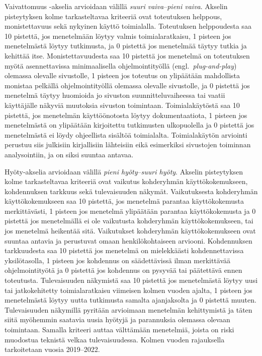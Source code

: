 \documentclass[finnish, 12pt, a4paper, elec, utf8, a-1b, online]{aaltothesis}
\begin{document}
Vaivattomuus -akselia arvioidaan välillä \textit{suuri vaiva}--\textit{pieni
vaiva}. Akselin pisteytyksen kolme tarkasteltavaa kriteeriä ovat toteutuksen
helppous, monistettavuus sekä nykyinen käyttö toimialalla. Toteutuksen
helppoudesta saa 10 pistettä, jos menetelmään löytyy valmis toimialaratkaisu, 1
pisteen jos menetelmästä löytyy tutkimusta, ja 0 pistettä jos menetelmää täytyy
tutkia ja kehittää itse. Monistettavuudesta saa 10 pistettä jos menetelmä on
toteutuksen myötä asennettavissa minimaalisella ohjelmointityöllä
(engl.~\textit{plug-and-play}) olemassa olevalle sivustolle, 1 pisteen jos
toteutus on ylipäätään mahdollista monistaa pelkällä ohjelmointityöllä
olemassa olevalle sivustolle, ja 0 pistettä jos menetelmä täytyy huomioida jo
sivuston suunnitteluvaiheessa tai vaatii käyttäjälle näkyviä muutoksia sivuston
toimintaan. Toimialakäytöstä saa 10 pistettä, jos menetelmän käyttöönotosta
löytyy dokumentaatiota, 1 pisteen jos menetelmästä on ylipäätään kirjoitettu
tutkimusten ulkopuolella ja 0 pistettä jos menetelmästä ei löydy ohjeellista
sisältöä toimialalta. Toimialakäytön arviointi perustuu siis julkisiin
kirjallisiin lähteisiin eikä esimerkiksi sivustojen toiminnan analysointiin, ja
on siksi suuntaa antavaa.

Hyöty-akselia arvioidaan välillä \textit{pieni hyöty}--\textit{suuri hyöty}.
Akselin pisteytyksen kolme tarkasteltavaa kriteeriä ovat vaikutus kohderyhmän
käyttökokemukseen, kohdennuksen tarkkuus sekä tulevaisuuden näkymät.
Vaikutuksesta kohderyhmän käyttökokemukseen saa 10 pistettä, jos menetelmä
parantaa käyttökokemusta merkittävästi, 1 pisteen jos menetelmä ylipäätään
parantaa käyttökokemusta ja 0 pistettä jos menetelmällä ei ole vaikutusta
kohderyhmän käyttökokemukseen, tai jos menetelmä heikentää sitä. Vaikutukset
kohderyhmän käyttökokemukseen ovat suuntaa antavia ja perustuvat omaan
henkilökohtaiseen arviooni. Kohdennuksen tarkkuudesta saa 10 pistettä jos
menetelmä on mielekkäästi kohdennettavissa yksilötasolla, 1 pisteen jos
kohdennus on säädettävissä ilman merkittävää ohjelmointityötä ja 0 pistettä jos
kohdennus on pysyvää tai päätettävä ennen toteutusta. Tulevaisuuden näkymistä
saa 10 pistettä jos menetelmästä löytyy uusi tai jatkokehitetty toimialaratkaisu
viimeisen kolmen vuoden ajalta, 1 pisteen jos menetelmästä löytyy uutta
tutkimusta samalta ajanjaksolta ja 0 pistettä muuten. Tulevaisuuden näkymillä
pyritään arvioimaan menetelmän kehittymistä ja täten siitä myöhemmin saatavia
uusia hyötyjä ja parannuksia olemassa olevaan toimintaan. Samalla kriteeri auttaa
välttämään menetelmiä, joista on riski muodostua teknistä velkaa tulevaisuudessa.
Kolmen vuoden rajauksella tarkoitetaan vuosia 2019--2022.
\end{document}
